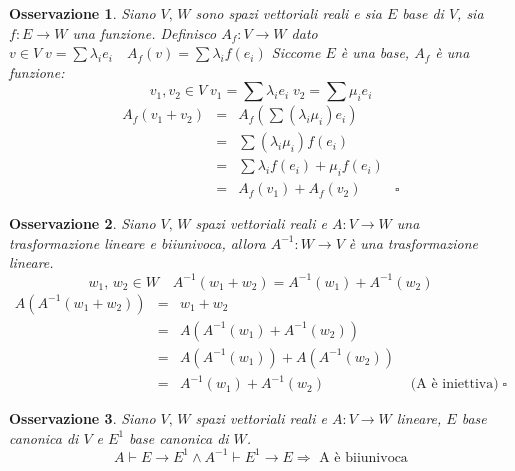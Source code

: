 \documentclass[12pt,a4paper]{article}
\theoremstyle{break}
\newtheorem{observation}{Osservazione}[subsection]
\newcommand{\func}[3]{#1:#2\rightarrow #3}
\begin{document}
    \begin{observation}
        Siano $V,\, W$ sono spazi vettoriali reali e sia $E$ base di $V$, sia $\func{f}{E}{W}$ una funzione.\newline
        Definisco $\func{A_f}{V}{W}$ dato $v\in V\; v = \sum \lambda_ie_i\quad A_f(v) = \sum \lambda_i f(e_i)$\newline
        Siccome $E$ è una base, $A_f$ è una funzione:
        \[
            v_1,v_2 \in V\; v_1 = \sum \lambda_ie_i\; v_2 = \sum \mu_ie_i
        \]
        \[
            \begin{matrix}
                A_f(v_1 + v_2) & = & A_f(\sum(\lambda_i \mu_i)e_i)\\
                & = & \sum (\lambda_i \mu_i)f(e_i) \\
                & = & \sum \lambda_if(e_i) + \mu_if(e_i) \\
                & = & A_f(v_1) + A_f(v_2) & \square
            \end{matrix}
        \]
    \end{observation}
    \begin{observation}
        Siano $V,\, W$ spazi vettoriali reali e $\func{A}{V}{W}$ una trasformazione lineare e biiunivoca, allora $\func{A^{-1}}{W}{V}$ è una trasformazione lineare.
        \[w_1,\, w_2 \in W\quad A^{-1}(w_1 + w_2) = A^{-1}(w_1) + A^{-1}(w_2)\]
        \[
            \begin{matrix}
                A(A^{-1}(w_1 + w_2)) & = & w_1 + w_2 \\
                & = & A(A^{-1}(w_1) + A^{-1}(w_2)) \\
                & = & A(A^{-1}(w_1)) + A(A^{-1}(w_2)) \\
                & = & A^{-1}(w_1) + A^{-1}(w_2) & \text{ (A è iniettiva)}\;\square
            \end{matrix}
        \]
    \end{observation}
    \begin{observation}
        Siano $V,\, W$ spazi vettoriali reali e $\func{A}{V}{W}$ lineare, $E$ base canonica di $V$ e $E^1$ base canonica di $W$.
        \[A\vdash E \rightarrow E^1 \wedge A^{-1}\vdash E^1 \rightarrow E \Rightarrow \text{ A è biiunivoca}\]
    \end{observation}
    \newpage
\end{document}
